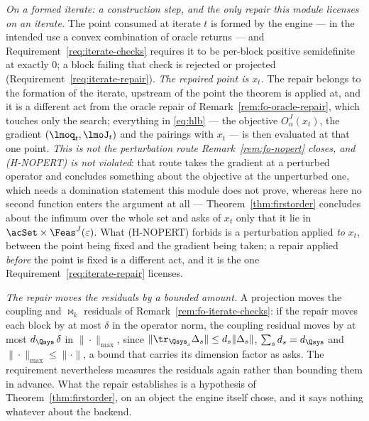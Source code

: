
\begin{remark}\label{rem:fo-iterate-repair}
\emph{On a formed iterate: a construction step, and the only repair this
module licenses on an iterate.} The point consumed at iterate $t$ is formed
by the engine --- in the intended use a convex combination of oracle
returns --- and Requirement~\ref{req:iterate-checks} requires it to be
per-block positive semidefinite at exactly $0$; a block failing that check
is rejected or projected (Requirement~\ref{req:iterate-repair}).
\emph{The repaired point is $x_t$.} The repair belongs to the formation of
the iterate, upstream of the point the theorem is applied at, and it is a
different act from the oracle repair of Remark~\ref{rem:fo-oracle-repair},
which touches only the search; everything in \eqref{eq:hlb} --- the
objective $O^{J}_{\alpha}(x_t)$, the gradient $(\lmoq_t,\lmoJ_t)$ and the
pairings with $x_t$ --- is then evaluated at that one point. \emph{This is not the perturbation route
Remark~\ref{rem:fo-nopert} closes, and (H-NOPERT) is not violated}: that
route takes the gradient at a perturbed operator and concludes something
about the objective at the unperturbed one, which needs a domination
statement this module does not prove, whereas here no second function
enters the argument at all --- Theorem~\ref{thm:firstorder} concludes about
the infimum over the whole set and asks of $x_t$ only that it lie in
$\acSet\times\Feas^{J}(\varepsilon)$. What (H-NOPERT) forbids is a
perturbation applied \emph{to} $x_t$, between the point being fixed and the
gradient being taken; a repair applied \emph{before} the point is fixed is a
different act, and it is the one Requirement~\ref{req:iterate-repair}
licenses.

\emph{The repair moves the residuals by a bounded amount.} A projection
moves the coupling and $\bowtie_k$ residuals of
Remark~\ref{rem:fo-iterate-checks}: if the repair moves each block by at
most $\delta$ in the operator norm, the coupling residual moves by at most
$d_{\Qsys}\,\delta$ in $\|\cdot\|_{\max}$, since
$\|\tr_{\Qsys_s}\Delta_s\|\le d_s\|\Delta_s\|$, $\sum_sd_s=d_{\Qsys}$ and
$\|\cdot\|_{\max}\le\|\cdot\|$, a bound that carries its dimension factor
as  asks. The requirement nevertheless
measures the residuals again rather than bounding them in advance.
What the repair establishes is a hypothesis of
Theorem~\ref{thm:firstorder}, on an object the engine itself chose, and it
says nothing whatever about the backend.


\end{remark}
